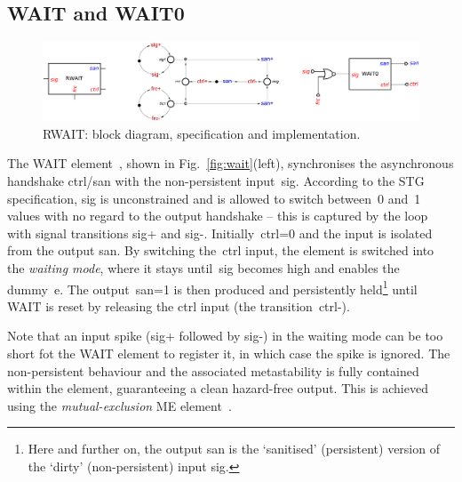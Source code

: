 \documentclass[conference]{IEEEtran}
\begin{document}
\subsection*{\textsf{WAIT} and \textsf{WAIT0}}

\begin{figure}
\begin{center}
    \includegraphics[scale=0.23]{fig/RWAIT.pdf}
    \vspace{-1mm}
    \caption{\textsf{RWAIT}: block diagram, specification and implementation.}
    \label{fig:rwait}
    \vspace{-5mm}
\end{center}
\end{figure}

The \textsf{WAIT} element~\cite{2015_sokolov_multiphase}, shown in Fig.~\ref{fig:wait}(left),
synchronises the asynchronous handshake \textsf{ctrl/san} with the non-persistent
input~\textsf{sig}. According to the STG specification, \textsf{sig} is unconstrained and
is allowed to switch between~0 and~1 values with no regard to the output handshake -- this
is captured by the loop with signal transitions \textsf{sig+} and \textsf{sig-}.
Initially~\textsf{ctrl=0} and the input is isolated from the output \textsf{san}.
By switching the~\textsf{ctrl} input, the element is switched into the \emph{waiting mode},
where it stays until~\textsf{sig} becomes high and enables the
dummy~\textsf{e}. The output~\textsf{san=1} is then produced and persistently
held\footnote{Here and further on, the output \textsf{san}
is the `sanitised' (persistent) version of the `dirty' (non-persistent) input \textsf{sig}.}
until \textsf{WAIT} is reset by releasing the \textsf{ctrl} input (the transition~\textsf{ctrl-}).

Note that an input spike (\textsf{sig+} followed by \textsf{sig-}) in the waiting
mode can be too short fot the \textsf{WAIT} element to register it, in which case the spike
is ignored. The non-persistent behaviour and the associated metastability is fully contained
within the element, guaranteeing a clean hazard-free output. This is achieved using the
\emph{mutual-exclusion} \textsf{ME} element~\cite{2008_kinniment_synchronisation}.
\end{document}
